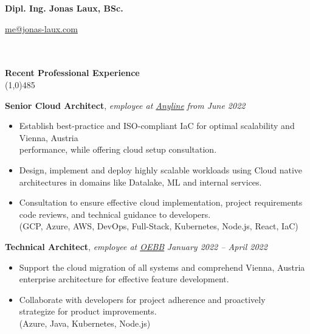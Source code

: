 \documentclass[9pt]{extarticle}
\newcommand\negativespace[1][-0.12cm]{\hspace*{#1}}
\begin{document}
\centerline{{\LARGE \bf Dipl. Ing. Jonas Laux, BSc.}}
\centerline{\href{mailto:me@jonas-laux.com}{me@jonas-laux.com}}


\noindent %
\\\\
\vspace*{-6pt}
{\negativespace \Large \bf Recent Professional Experience}\\
\line(1,0){485}
\\
\noindent

\noindent
{\bf Senior Cloud Architect}, \textit{employee at \href{https://anyline.com}{Anyline}}  \hfill \textit{from June 2022}
\begin{itemize}
\setlength\itemsep{0.05em}
\item Establish best-practice and ISO-compliant IaC for optimal scalability and \hfill Vienna, Austria \\
performance, while offering cloud setup consultation.
\item Design, implement and deploy highly scalable workloads using Cloud native \\
architectures in domains like Datalake, ML and internal services.
\item Consultation to ensure effective cloud implementation, project requirements \\
code reviews, and technical guidance to developers. \\
(GCP, Azure, AWS, DevOps, Full-Stack, Kubernetes, Node.js, React, IaC) \\
\end{itemize}

\noindent
{\bf Technical Architect}, \textit{employee at \href{https://www.oebb.at/}{OEBB}}  \hfill \textit{January 2022 -- April 2022}
\begin{itemize}
\setlength\itemsep{0.05em}
\item Support the cloud migration of all systems and comprehend \hfill Vienna, Austria \\
enterprise architecture for effective feature development.
\item Collaborate with developers for project adherence and proactively \\ 
strategize for product improvements. \\
(Azure, Java, Kubernetes, Node.js) \\
\end{itemize}
\end{document}
